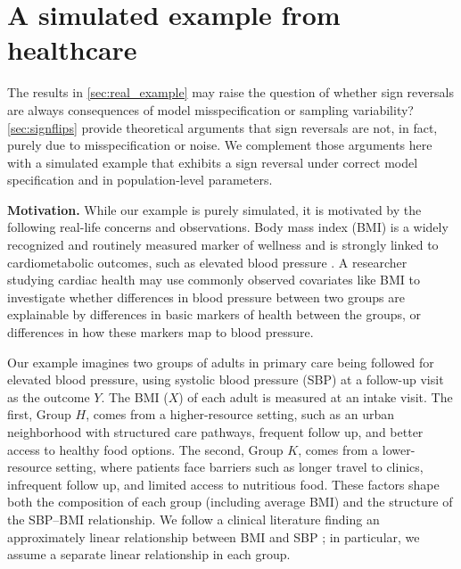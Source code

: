 \section{A simulated example from healthcare}
\label{sec:simulated_example}
The results in \cref{sec:real_example} may raise the question of whether sign reversals are always consequences of model misspecification or sampling variability? 
\cref{sec:signflips} provide theoretical arguments that sign reversals are not, in fact, purely due to misspecification or noise.
We complement those arguments here with a simulated example that exhibits a sign reversal under correct model specification and in population-level parameters.


\textbf{Motivation.}
While our example is purely simulated, it is motivated by the following real-life concerns and observations.
Body mass index (BMI) is a widely recognized and routinely measured marker of wellness \cite{heymsfield2016} and is strongly linked to cardiometabolic outcomes, such as elevated blood pressure \cite{brown2000body}.
A researcher studying cardiac health may use commonly observed covariates like BMI to investigate whether differences in blood pressure between two groups are explainable by differences in basic markers of health between the groups, or differences in how these markers map to blood pressure.

Our example imagines two groups of adults in primary care being followed for elevated blood pressure, using systolic blood pressure (SBP) at a follow-up visit as the outcome $Y$. The BMI ($X$) of each adult is measured at an intake visit.
The first, Group $H$, comes from a higher-resource setting, such as an urban neighborhood with structured care pathways, frequent follow up, and better access to healthy food options. 
The second, Group $K$, comes from a lower-resource setting, where patients face barriers such as longer travel to clinics, infrequent follow up, and limited access to nutritious food.
These factors shape both the composition of each group (including average BMI) and the structure of the SBP--BMI relationship. We follow a clinical literature finding an approximately linear relationship between BMI and SBP \cite{kaufman1997, cappuccio2008, chen2023}; in particular, we assume a separate linear relationship in each group.

